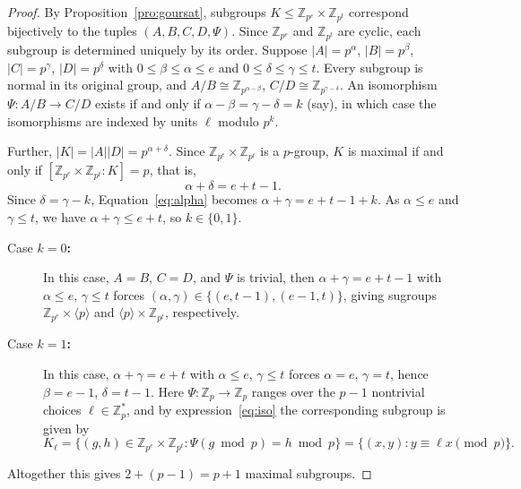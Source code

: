 \documentclass[11pt]{article}
\def \Z {{\mathbb Z}}
\begin{document}
        \begin{proof}
        By Proposition~\ref{pro:goursat}, subgroups $K \leq \mathbb{Z}_{p^e} \times \mathbb{Z}_{p^t}$ correspond bijectively to the tuples $(A,B,C,D,\Psi)$. Since $\mathbb{Z}_{p^e}$ and $\mathbb{Z}_{p^t}$ are cyclic, each subgroup is determined uniquely by its order. 
        Suppose $|A| = p^\alpha$, $|B| = p^\beta$, $|C| = p^\gamma$, $|D| = p^\delta$ with $0 \leq \beta \leq \alpha \leq e$ and $0 \leq \delta \leq \gamma \leq t$. Every subgroup is normal in its original group, and $A/B \cong \mathbb{Z}_{p^{\alpha-\beta}}$, $C/D \cong \mathbb{Z}_{p^{\gamma-\delta}}$. An isomorphism $\Psi : A/B \to C/D$ exists if and only if $\alpha - \beta = \gamma - \delta=k$ (say), in which case the isomorphisms are indexed by units $\ell$ modulo $p^k$.
        
   Further, $|K| = |A||D| = p^{\alpha+\delta}$. Since $\Z_{p^e}\times \Z_{p^t}$ is a $p$-group, $K$ is maximal if and only if $[\Z_{p^e}\times \Z_{p^t}: K] = p$, that is,
        \begin{equation}\label{eq:alpha}
        \alpha + \delta = e + t - 1. 
        \end{equation}
        Since $\delta = \gamma - k$, Equation~\ref{eq:alpha} becomes $\alpha + \gamma = e + t - 1 + k$. As $\alpha \leq e$ and $\gamma \leq t$, we have $\alpha + \gamma \leq e + t$, so $k \in \{0, 1\}$.
        \begin{description}
        \item[Case \bf{$k = 0$}:] In this case, $A = B$, $C = D$, and $\Psi$ is trivial, then $\alpha + \gamma = e + t - 1$ with $\alpha \leq e$, $\gamma \leq t$ forces $(\alpha, \gamma) \in \{(e, t-1), (e-1, t)\}$, giving sugroups $\Z_{p^e} \times \langle p \rangle$ and $\langle p \rangle \times \Z_{p^t}$, respectively.
        
        \item[Case \bf{$k = 1$}:] In this case, $\alpha + \gamma = e + t$ with $\alpha \leq e$, $\gamma \leq t$ forces $\alpha = e$, $\gamma = t$, hence $\beta = e-1$, $\delta = t-1$. Here $\Psi : \mathbb{Z}_p \to \mathbb{Z}_p$ ranges over the $p-1$ nontrivial choices $\ell \in \mathbb{Z}_p^*$, and by expression~\ref{eq:iso} the corresponding subgroup is given by
        \[
        K_\ell =\{(g,h) \in \Z_{p^e} \times \Z_{p^t} : \Psi(g \bmod p) = h \bmod p\} = \{(x,y) : y \equiv \ell x \pmod{p}\}.
        \]
        \end{description}
        Altogether this gives $2 + (p-1) = p+1$ maximal subgroups.
        \end{proof}
\end{document}
